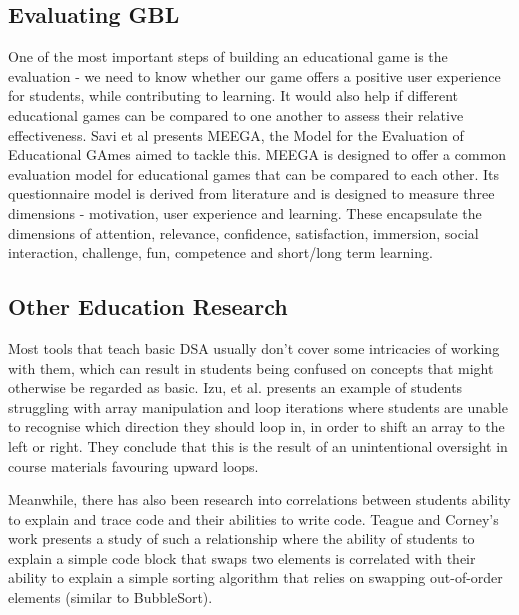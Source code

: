 \documentclass[10pt]{article}
\begin{document}
\subsection{Evaluating GBL}
\label{meegalitrev}
One of the most important steps of building an educational game is the evaluation - we need to know whether our game offers a positive user experience for students, while contributing to learning. It would also help if different educational games can be compared to one another to assess their relative effectiveness. Savi et al presents MEEGA\cite{Rafael}\cite{meegaPlus}, the Model for the Evaluation of Educational GAmes aimed to tackle this. MEEGA is designed to offer a common evaluation model for educational games that can be compared to each other. Its questionnaire model is derived from literature and is designed to measure three dimensions - motivation, user experience and learning. These encapsulate the dimensions of attention, relevance, confidence, satisfaction, immersion, social interaction, challenge, fun, competence and short/long term learning.
\subsection{Other Education Research}
Most tools that teach basic DSA usually don't cover some intricacies of working with them, which can result in students being confused on concepts that might otherwise be regarded as basic. Izu, et al.\cite{izuloop} presents an example of students struggling with array manipulation and loop iterations where students are unable to recognise which direction they should loop in, in order to shift an array to the left or right. They conclude that this is the result of an unintentional oversight in course materials favouring upward loops.\par
Meanwhile, there has also been research into correlations between students ability to explain and trace code and their abilities to write code. Teague and Corney's work\cite{Teague:2012:SHW:2483716.2483727} presents a study of such a relationship where the ability of students to explain a simple code block that swaps two elements is correlated with their ability to explain a simple sorting algorithm that relies on swapping out-of-order elements (similar to BubbleSort).
\end{document}
